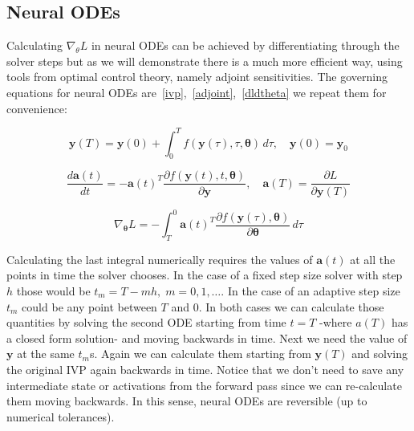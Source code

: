\documentclass{article}
\begin{document}

    \subsection{Neural ODEs}
    Calculating $\nabla_{\theta}L$ in neural ODEs can be achieved by differentiating through the solver steps but as we will demonstrate there is a much more efficient way, using tools from optimal control theory, namely adjoint sensitivities.
    The governing equations for neural ODEs are~\eqref{ivp},~\eqref{adjoint},~\eqref{dldtheta} we repeat them for convenience:

    \begin{equation*}
        \pmb{y}(T) =  \pmb{y}(0) +\int_{0}^{T} f(\pmb{y}(\tau), \tau, \pmb{\theta}) \,d\tau
        , \quad
        \pmb{y}(0) = \pmb{y}_0
    \end{equation*}

    \begin{equation*}
        \frac
        {d \pmb{a}(t)}
        {dt}
        =
        - \pmb{a}(t)^T
        \frac
        {\partial f( \pmb{y}(t), t, \pmb{\theta} )}
        {\partial \pmb{y} }
        , \quad
        \pmb{a}(T) = \frac{\partial L}{\partial \pmb{y}(T)}
    \end{equation*}

    \begin{equation*}
        \nabla_{\pmb{\theta}} L =
        - \int_T^0
        \pmb{a}(t)^T
        \frac
        {\partial f(\pmb{y}(\tau), \pmb{\theta})}
        {\partial \pmb{\theta}}
        \, d\tau
    \end{equation*}

    Calculating the last integral numerically requires the values of $\pmb{a}(t)$ at all the points in time the solver chooses.
    In the case of a fixed step size solver with step $h$ those would be $t_m = T - mh, \; m=0,1,\dots$.
    In the case of an adaptive step size $t_m$ could be any point between $T$ and $0$.
    In both cases we can calculate those quantities by solving the second ODE starting from time $t=T$ -where $a(T)$ has a closed form solution- and moving backwards in time.
    Next we need the value of $\pmb{y}$ at the same $t_m$s. Again we can calculate them starting from $\pmb{y}(T)$ and solving the original IVP again backwards in time.
    Notice that we don't need to save any intermediate state or activations from the forward pass since we can re-calculate them moving backwards.
    In this sense, neural ODEs are reversible (up to numerical tolerances).
\end{document}
